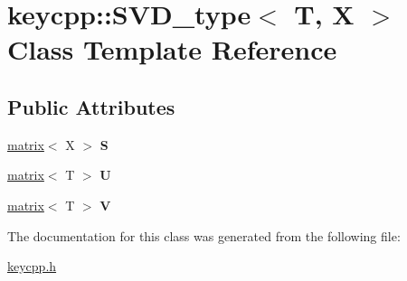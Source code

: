 \hypertarget{classkeycpp_1_1_s_v_d__type}{\section{keycpp\-:\-:S\-V\-D\-\_\-type$<$ T, X $>$ Class Template Reference}
\label{classkeycpp_1_1_s_v_d__type}
}
\subsection*{Public Attributes}
\begin{DoxyCompactItemize}
\item 
\hypertarget{classkeycpp_1_1_s_v_d__type_afcf98e82919e015758d99cee5adb65bf}{\hyperlink{classkeycpp_1_1matrix}{matrix}$<$ X $>$ {\bfseries S}}\label{classkeycpp_1_1_s_v_d__type_afcf98e82919e015758d99cee5adb65bf}

\item 
\hypertarget{classkeycpp_1_1_s_v_d__type_a31194fbf88ec1fb87f2681d0f518761d}{\hyperlink{classkeycpp_1_1matrix}{matrix}$<$ T $>$ {\bfseries U}}\label{classkeycpp_1_1_s_v_d__type_a31194fbf88ec1fb87f2681d0f518761d}

\item 
\hypertarget{classkeycpp_1_1_s_v_d__type_ad0a6e396e2548ab4762a5676ae88e4bd}{\hyperlink{classkeycpp_1_1matrix}{matrix}$<$ T $>$ {\bfseries V}}\label{classkeycpp_1_1_s_v_d__type_ad0a6e396e2548ab4762a5676ae88e4bd}

\end{DoxyCompactItemize}


The documentation for this class was generated from the following file\-:\begin{DoxyCompactItemize}
\item 
\hyperlink{keycpp_8h}{keycpp.\-h}\end{DoxyCompactItemize}
